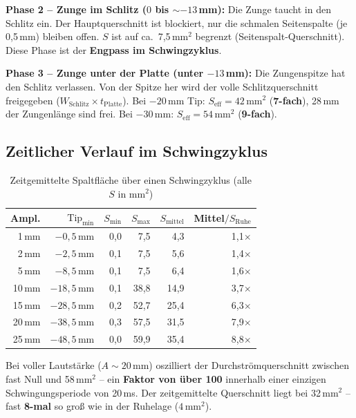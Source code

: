 \documentclass[11pt,a4paper]{article}
\begin{document}
\textbf{Phase 2 -- Zunge im Schlitz ($0$ bis $\sim$$-13$\,mm):} Die Zunge taucht in den Schlitz ein. Der Hauptquerschnitt ist blockiert, nur die schmalen Seitenspalte (je 0{,}5\,mm) bleiben offen. $S$ ist auf ca.\ 7{,}5\,mm$^2$ begrenzt (Seitenspalt-Querschnitt). Diese Phase ist der \textbf{Engpass im Schwingzyklus}.

\textbf{Phase 3 -- Zunge unter der Platte (unter $-13$\,mm):} Die Zungenspitze hat den Schlitz verlassen. Von der Spitze her wird der volle Schlitzquerschnitt freigegeben ($W_\text{Schlitz} \times t_\text{Platte}$). Bei $-20$\,mm Tip: $S_\text{eff} = 42$\,mm$^2$ (\textbf{7-fach}), 28\,mm der Zungenlänge sind frei. Bei $-30$\,mm: $S_\text{eff} = 54$\,mm$^2$ (\textbf{9-fach}).

\subsection{Zeitlicher Verlauf im Schwingzyklus}

\begin{table}[H]
\centering\small
\begin{tabular}{r r r r r r}
\toprule
\textbf{Ampl.} & $\text{Tip}_\text{min}$ & $S_\text{min}$ & $S_\text{max}$ & $S_\text{mittel}$ & Mittel$/S_\text{Ruhe}$ \\
\midrule
1\,mm & $-0{,}5$\,mm & 0{,}0 & 7{,}5 & 4{,}3 & 1{,}1$\times$ \\
2\,mm & $-2{,}5$\,mm & 0{,}1 & 7{,}5 & 5{,}6 & 1{,}4$\times$ \\
5\,mm & $-8{,}5$\,mm & 0{,}1 & 7{,}5 & 6{,}4 & 1{,}6$\times$ \\
10\,mm & $-18{,}5$\,mm & 0{,}1 & 38{,}8 & 14{,}9 & 3{,}7$\times$ \\
15\,mm & $-28{,}5$\,mm & 0{,}2 & 52{,}7 & 25{,}4 & 6{,}3$\times$ \\
20\,mm & $-38{,}5$\,mm & 0{,}3 & 57{,}5 & 31{,}5 & 7{,}9$\times$ \\
25\,mm & $-48{,}5$\,mm & 0{,}0 & 59{,}9 & 35{,}4 & 8{,}8$\times$ \\
\bottomrule
\end{tabular}
\caption{Zeitgemittelte Spaltfläche über einen Schwingzyklus (alle $S$ in mm$^2$)}
\end{table}

\begin{warnbox}
Bei voller Lautstärke ($A \sim 20$\,mm) oszilliert der Durchströmquerschnitt zwischen fast Null und 58\,mm$^2$ -- ein \textbf{Faktor von über 100} innerhalb einer einzigen Schwingungsperiode von 20\,ms. Der zeitgemittelte Querschnitt liegt bei 32\,mm$^2$ -- fast \textbf{8-mal} so groß wie in der Ruhelage ($4$\,mm$^2$).
\end{warnbox}
\end{document}
